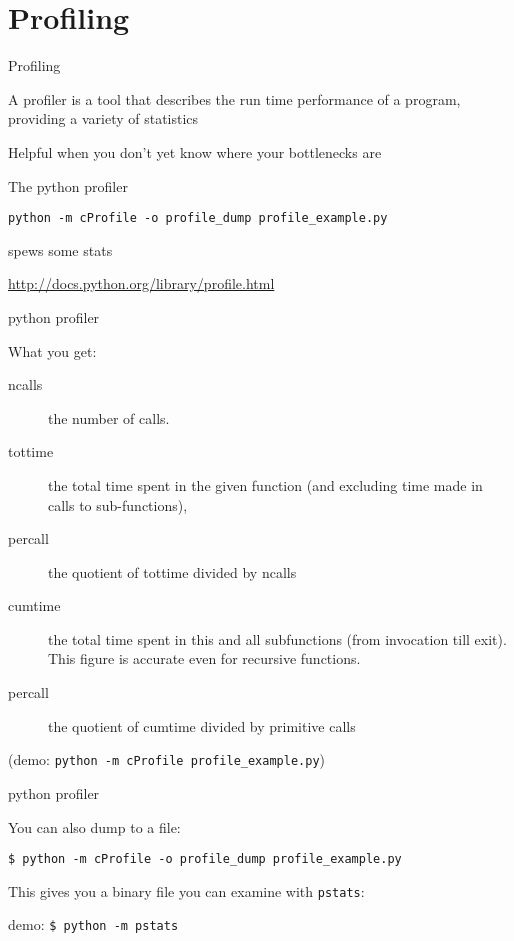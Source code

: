 \documentclass{beamer}
\begin{document}
\section{Profiling}

\begin{frame}[fragile]{Profiling}

{\Large A profiler is a tool that describes the run time performance of a
program, providing a variety of statistics}

\vfill
{\Large Helpful when you don't yet know where your bottlenecks are}

\vfill
{\Large The python profiler}

\begin{verbatim}
python -m cProfile -o profile_dump profile_example.py  
\end{verbatim}
{\Large spews some stats}


\vfill
\url{http://docs.python.org/library/profile.html}
\end{frame} 

\begin{frame}[fragile]{python profiler}

{\Large What you get:}

\begin{description}
  \item[ncalls] the number of calls.
  \item[tottime] the total time spent in the given function (and excluding time made in calls to sub-functions),
  \item[percall] the quotient of tottime divided by ncalls
  \item[cumtime] the total time spent in this and all subfunctions (from invocation till exit). This figure is accurate even for recursive functions.
  \item[percall] the quotient of cumtime divided by primitive calls
\end{description}
(demo: \verb|python -m cProfile profile_example.py|)
\end{frame} 

\begin{frame}[fragile]{python profiler}

{\Large You can also dump to a file:}

\vfill
{\verb|$ python -m cProfile -o profile_dump profile_example.py|}

\vfill
{\large This gives you a binary file you can examine with \verb|pstats|:}

\vfill
{demo: \verb|$ python -m pstats|}

\end{frame} 
\end{document}
